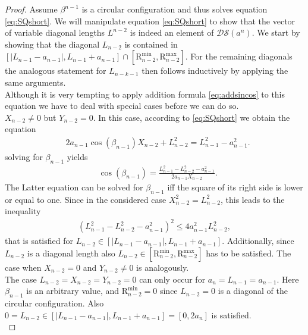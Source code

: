 \documentclass[10pt,a4paper]{amsart}
\begin{document}
\begin{proof} Assume $\beta^{n-1}$ is a circular configuration and thus solves equation \eqref{eq:SQshort}. We will manipulate equation \eqref{eq:SQshort} to show that the vector of variable diagonal lengths $L^{n-2}$ is indeed an element of $\mathcal{DS}({a^n})$. We start by showing  that the diagonal $L_{n-2}$ is contained  in $[|L_{n-1}-a_{n-1}|, L_{n-1}+a_{n-1}] \cap [ \mathrm{    R}_{n-2}^{\min} , \mathrm{    R}_{n-2}^{\max}]$. For the remaining diagonals the analogous statement for $L_{n-k-1}$ then follows inductively by applying the same arguments.\\

Although it is very tempting to apply addition formula \eqref{eq:addsincos} to this equation we have to  deal with special cases before we can do so.\\

$X_{n-2} \neq 0$ but $Y_{n-2} = 0$. In this case, according to \eqref{eq:SQshort} we obtain the equation  \begin{align*}
& 2 a_{n-1} \cos(\beta_{n-1} )  X_{n-2} + L_{n-2}^2  =  L_{n-1}^2 - a_{n-1}^2.  
\end{align*}
solving for $\beta_{n-1}$ yields  
\begin{align*}
& \cos(\beta_{n-1} )     =  \frac{ L_{n-1}^2 - L_{n-2}^2- a_{n-1}^2 }{ 2 a_{n-1}  X_{n-2}  }.  
\end{align*}
The Latter equation can be solved for $\beta_{n-1}$ iff the square of its right side is lower or equal to one. Since in the considered case $ X_{n-2}^2 = L_{n-2}^2$,  this leads to the inequality   
\begin{align}\label{ieq:diagonals}
\left(   L_{n-1}^2 - L_{n-2}^2- a_{n-1}^2 \right)^2 \leq  4 a_{n-1}^2 L_{n-2}^2, 
\end{align}
that is satisfied for $L_{n-2} \in [ |L_{n-1} -a_{n-1}|,  L_{n-1} +a_{n-1} ]$. Additionally, since $L_{n-2}$ is a diagonal length also $L_{n-2} \in [\mathrm{R}_{n-2}^{\min}, \mathrm{    R}_{n-2}^{\max}]$ has to be satisfied. The case when $X_{n-2} = 0$ and $Y_{n-2} \neq 0$ is analogously.\\       

The case $ L_{n-2} = X_{n-2} = Y_{n-2} = 0$ can only  occur for $a_n = L_{n-1} = a_{n-1}$. Here $\beta_{n-1}$ is an arbitrary value, and $\mathrm{R}_{n-2}^{\min} = 0$ since $L_{n-2} = 0 $  is a diagonal of the circular configuration. Also $0 = L_{n-2} \in [ |L_{n-1} -a_{n-1}|,  L_{n-1} +a_{n-1} ] = [0, 2 a _n ]$ is satisfied.\\ 


\end{proof}
\end{document}
